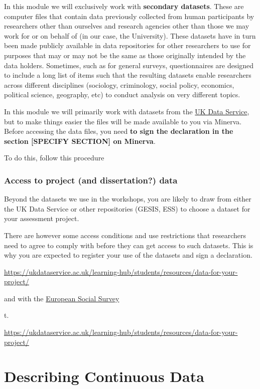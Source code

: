 \documentclass[
  letterpaper,
  DIV=11,
  numbers=noendperiod]{scrreprt}
\begin{document}
In this module we will exclusively work with \textbf{secondary
datasets}. These are computer files that contain data previously
collected from human participants by researchers other than ourselves
and research agencies other than those we may work for or on behalf of
(in our case, the University). These datasets have in turn been made
publicly available in data repositories for other researchers to use for
purposes that may or may not be the same as those originally intended by
the data holders. Sometimes, such as for general surveys, questionnaires
are designed to include a long list of items such that the resulting
datasets enable researchers across different disciplines (sociology,
criminology, social policy, economics, political science, geography,
etc) to conduct analysis on very different topics.

In this module we will primarily work with datasets from the
\href{https://ukdataservice.ac.uk}{UK Data Service}, but to make things
easier the files will be made available to you via Minerva. Before
accessing the data files, you need \textbf{to sign the declaration in
the section {[}SPECIFY SECTION{]} on Minerva}.

To do this, follow this procedure

\subsection{Access to project (and dissertation?)
data}\label{access-to-project-and-dissertation-data}

Beyond the datasets we use in the workshops, you are likely to draw from
either the UK Data Service or other repositories (GESIS, ESS) to choose
a dataset for your assessment project.

There are however some access conditions and use restrictions that
researchers need to agree to comply with before they can get access to
such datasets. This is why you are expected to register your use of the
datasets and sign a declaration.

\url{https://ukdataservice.ac.uk/learning-hub/students/resources/data-for-your-project/}

and with the \href{https://www.europeansocialsurvey.org}{European Social
Survey}

t.

\url{https://ukdataservice.ac.uk/learning-hub/students/resources/data-for-your-project/}


\chapter{Describing Continuous Data}\label{describing-continuous-data}
\end{document}
